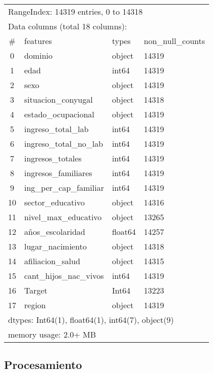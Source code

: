 \documentclass[a4paper]{article}
\begin{document}
        \begin{table}[H]
            \centering
            \begin{tabular}{clll}
                \multicolumn{4}{l}{RangeIndex: 14319 entries, 0 to 14318} \\
                \multicolumn{4}{l}{Data columns (total 18 columns):} \\
                \# & features & types & non\_null\_counts \\ \hline
                0  & dominio & object & 14319 \\ 
                1  & edad & int64 & 14319 \\ 
                2  & sexo & object & 14319 \\ 
                3  & situacion\_conyugal & object & 14318 \\ 
                4  & estado\_ocupacional & object & 14319 \\ 
                5  & ingreso\_total\_lab & int64 & 14319 \\ 
                6  & ingreso\_total\_no\_lab & int64 & 14319 \\ 
                7  & ingresos\_totales & int64 & 14319 \\ 
                8  & ingresos\_familiares & int64 & 14319 \\ 
                9  & ing\_per\_cap\_familiar & int64 & 14319 \\ 
                10  & sector\_educativo & object & 14316 \\ 
                11  & nivel\_max\_educativo & object & 13265 \\ 
                12  & años\_escolaridad & float64 & 14257 \\ 
                13  & lugar\_nacimiento & object & 14318 \\ 
                14  & afiliacion\_salud & object & 14315 \\ 
                15  & cant\_hijos\_nac\_vivos & int64 & 14319 \\ 
                16  & Target & Int64 & 13223 \\ 
                17  & region & object & 14319 \\ 
                \multicolumn{4}{l}{dtypes: Int64(1), float64(1), int64(7), object(9)} \\
                \multicolumn{4}{l}{memory usage: 2.0+ MB} 
            \end{tabular}
        \end{table}
    \subsection{Procesamiento}
\end{document}
